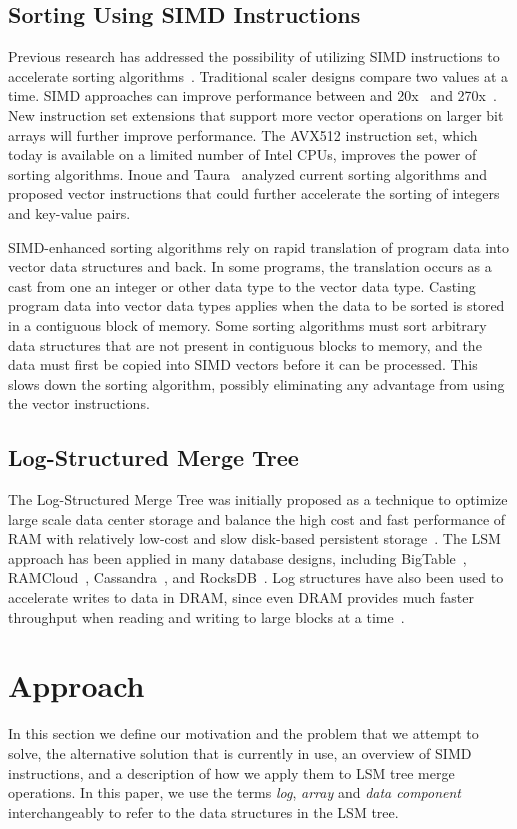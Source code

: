 \documentclass[10pt,twocolumn]{article}
\begin{document}
\subsection{Sorting Using SIMD Instructions}
Previous research has addressed the possibility of utilizing SIMD instructions to accelerate sorting algorithms~\cite{p13}.  Traditional scaler designs compare two values at a time.  SIMD approaches can improve performance between and 20x~\cite{p11} and 270x~\cite{p10}.  New instruction set extensions that support more vector operations on larger bit arrays will further improve performance.   The AVX512 instruction set, which today is available on a limited number of Intel CPUs, improves the power of sorting algorithms.  Inoue and Taura~\cite{p12} analyzed current sorting algorithms and proposed vector instructions that could further accelerate the sorting of integers and key-value pairs.  

SIMD-enhanced sorting algorithms rely on rapid translation of program data into vector data structures and back.  In some programs, the translation occurs as a cast from one an integer or other data type to the vector data type.  Casting program data into vector data types applies when the data to be sorted is stored in a contiguous block of memory.  Some sorting algorithms must sort arbitrary data structures that are not present in contiguous blocks to memory, and the data must first be copied into SIMD vectors before it can be processed.  This slows down the sorting algorithm, possibly eliminating any advantage from using the vector instructions.

\subsection{Log-Structured Merge Tree}
The Log-Structured Merge Tree was initially proposed as a technique to optimize large scale data center storage and balance the high cost and fast performance of RAM with relatively low-cost and slow disk-based persistent storage~\cite{p4}.  The LSM approach has been applied in many database designs, including BigTable~\cite{p5}, RAMCloud~\cite{p6}, Cassandra~\cite{p8}, and RocksDB~\cite{p7}.  Log structures have also been used to accelerate writes to data in DRAM, since even DRAM provides much faster throughput when reading and writing to large blocks at a time~\cite{p9}.

\section{Approach}
In this section we define our motivation and the problem that we attempt to solve, the alternative solution that is currently in use, an overview of SIMD instructions, and a description of how we apply them to LSM tree merge operations.  In this paper, we use the terms \textit{log}, \textit{array} and \textit{data component} interchangeably to refer to the data structures in the LSM tree.
\end{document}
